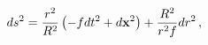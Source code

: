 \begin{equation}
ds^2 = {r^2\over R^2} \left( - f dt^2 + d{\bf x}^2\right)
+  {R^2\over r^2 f } d r^2 \,, 
\label{metric}
\end{equation}

